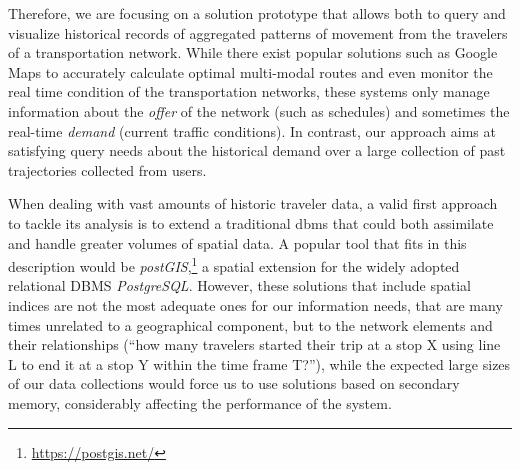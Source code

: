     
    Therefore, we are focusing on a solution prototype that allows both to query and visualize historical records of aggregated patterns of movement from the travelers of a transportation network. While there exist popular solutions such as Google Maps to accurately calculate optimal multi-modal routes and even monitor the real time condition of the transportation networks, these systems only manage information about the {\em offer} of the network (such as schedules) and sometimes the real-time {\em demand} (current traffic conditions). In contrast, our approach aims at satisfying query needs about the historical demand over a large collection of past trajectories collected from users.
    
    
    
    When dealing with vast amounts of historic traveler data, a valid first approach to tackle its analysis is to extend a traditional \gls{dbms} that could both assimilate and handle greater volumes of spatial data. A popular tool that fits in this description would be \textit{postGIS},\footnote{\url{https://postgis.net/}} a spatial extension for the widely adopted relational DBMS \textit{PostgreSQL}. 
    However, these solutions that include spatial indices are not the most adequate ones for our information needs, that are many times unrelated to a geographical component, but to the network elements and their relationships (``how many travelers started their trip at a stop X using line L to end it at a stop Y within the time frame T?''), while the expected large sizes of our data collections would force us to use solutions based on secondary memory, considerably affecting the performance of the system.
    
